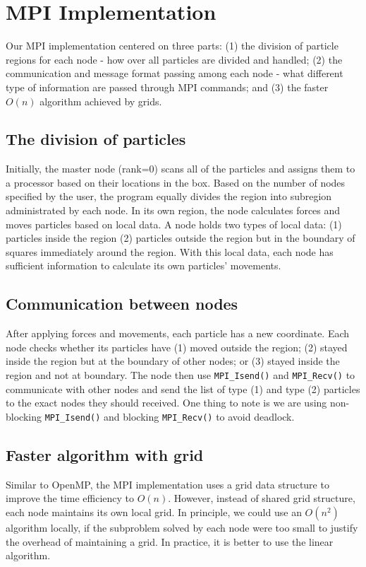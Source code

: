 \documentclass{article}
\newcommand{\code}[1]%
  {\texttt{#1}}
\begin{document}
\section{MPI Implementation}
Our MPI implementation centered on three parts: (1) the division of particle regions for each node - how over all particles are divided and handled; (2) the communication and message format passing among each node - what different type of information are passed through MPI commands; and (3) the faster $O(n)$ algorithm achieved by grids.

\subsection{The division of particles}
Initially, the master node (rank=0) scans all of the particles and assigns them to a processor based on their locations in the box. Based on the number of nodes specified by the user, the program equally divides the region into subregion administrated by each node. In its own region, the node calculates forces and moves particles based on local data. A node holds two types of local data: (1) particles inside the region (2) particles outside the region but in the boundary of squares immediately around the region. With this local data, each node has sufficient information to calculate its own particles' movements.

\subsection{Communication between nodes}
After applying forces and movements, each particle has a new coordinate. Each node checks whether its particles have (1) moved outside the region; (2) stayed inside the region but at the boundary of other nodes; or (3) stayed inside the region and not at boundary. The node then use \code{MPI\_Isend()} and \code{MPI\_Recv()} to communicate with other nodes and send the list of type (1) and type (2) particles to the exact nodes they should received. One thing to note is we are using non-blocking \code{MPI\_Isend()} and blocking \code{MPI\_Recv()} to avoid deadlock.

\subsection{Faster algorithm with grid}
Similar to OpenMP, the MPI implementation uses a grid data structure to improve the time efficiency to $O(n)$. However, instead of shared grid structure, each node maintains its own local grid. In principle, we could use an $O(n^2)$ algorithm locally, if the subproblem solved by each node were too small to justify the overhead of maintaining a grid.  In practice, it is better to use the linear algorithm.
\end{document}
